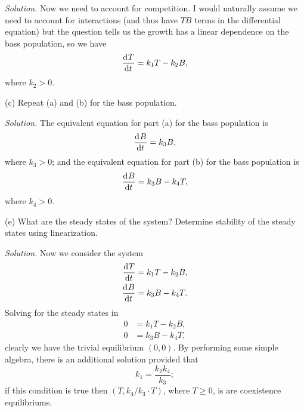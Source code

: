 \documentclass{article}
\begin{document}
\textit{Solution.}
Now we need to account for competition. I would naturally assume we
need to account for interactions (and thus have $T B$ terms in the differential
equation) but the question tells us the growth has a linear dependence on the
bass population, so we have
%
\begin{equation*}
    \dod{T}{t} = k_1 T - k_2 B
    ,
\end{equation*}
%
where $k_2 > 0$.

\vspace{5mm}

(c) Repeat (a) and (b) for the bass population.

\textit{Solution.}
The equivalent equation for part (a) for the bass population is
%
\begin{equation*}
    \dod{B}{t} = k_3 B
    ,
\end{equation*}
%
where $k_3 > 0$; and the equivalent equation for part (b) for the
bass population is
%
\begin{equation*}
    \dod{B}{t} = k_3 B - k_4 T
    ,
\end{equation*}
%
where $k_4 > 0$.

\vspace{5mm}

(e) What are the steady states of the system? Determine stability of the
steady states using linearization.

\textit{Solution.}
Now we consider the system
%
\begin{align*}
    \dod{T}{t} &= k_1 T - k_2 B, \\
    \dod{B}{t} &= k_3 B - k_4 T
    .
\end{align*}
%
Solving for the steady states in
%
\begin{align*}
    0 &= k_1 T - k_2 B, \\
    0 &= k_3 B - k_4 T
    ,
\end{align*}
%
clearly we have the trivial equilibrium $(0, 0)$. By performing some simple
algebra, there is an additional solution provided that
%
\begin{equation*}
    k_1 = \frac{k_2 k_4}{k_3}
    ;
\end{equation*}
%
if this condition is true then $(T, k_4 / k_3 \cdot T)$, where $T \geq 0$, is
are coexistence equilibriums.
\end{document}
